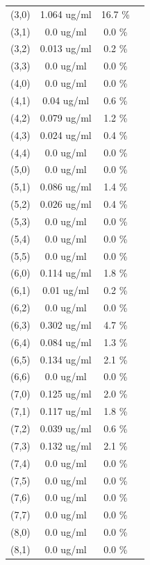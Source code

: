 \documentclass{article}
\begin{document}
\begin{tabular}{c c c c}
(3,0)&        1.064 ug/ml        &16.7 \%\\
(3,1)&        0.0 ug/ml        &0.0 \%\\
(3,2)&        0.013 ug/ml        &0.2 \%\\
(3,3)&        0.0 ug/ml        &0.0 \%\\
(4,0)&        0.0 ug/ml        &0.0 \%\\
(4,1)&        0.04 ug/ml        &0.6 \%\\
(4,2)&        0.079 ug/ml        &1.2 \%\\
(4,3)&        0.024 ug/ml        &0.4 \%\\
(4,4)&        0.0 ug/ml        &0.0 \%\\
(5,0)&        0.0 ug/ml        &0.0 \%\\
(5,1)&        0.086 ug/ml        &1.4 \%\\
(5,2)&        0.026 ug/ml        &0.4 \%\\
(5,3)&        0.0 ug/ml        &0.0 \%\\
(5,4)&        0.0 ug/ml        &0.0 \%\\
(5,5)&        0.0 ug/ml        &0.0 \%\\
(6,0)&        0.114 ug/ml        &1.8 \%\\
(6,1)&        0.01 ug/ml        &0.2 \%\\
(6,2)&        0.0 ug/ml        &0.0 \%\\
(6,3)&        0.302 ug/ml        &4.7 \%\\
(6,4)&        0.084 ug/ml        &1.3 \%\\
(6,5)&        0.134 ug/ml        &2.1 \%\\
(6,6)&        0.0 ug/ml        &0.0 \%\\
(7,0)&        0.125 ug/ml        &2.0 \%\\
(7,1)&        0.117 ug/ml        &1.8 \%\\
(7,2)&        0.039 ug/ml        &0.6 \%\\
(7,3)&        0.132 ug/ml        &2.1 \%\\
(7,4)&        0.0 ug/ml        &0.0 \%\\
(7,5)&        0.0 ug/ml        &0.0 \%\\
(7,6)&        0.0 ug/ml        &0.0 \%\\
(7,7)&        0.0 ug/ml        &0.0 \%\\
(8,0)&        0.0 ug/ml        &0.0 \%\\
(8,1)&        0.0 ug/ml        &0.0 \%\\

\end{tabular}
\end{document}
